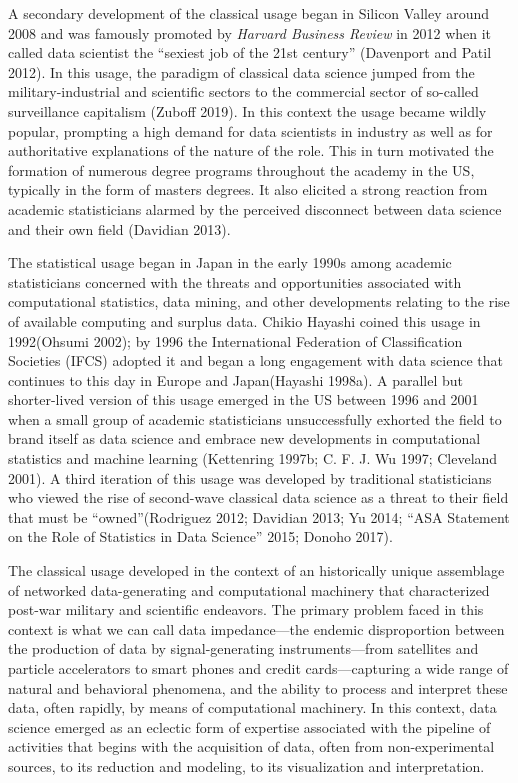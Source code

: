 \documentclass[
  letterpaper,
]{report}
\begin{document}
A secondary development of the classical usage began in Silicon Valley
around 2008 and was famously promoted by \emph{Harvard Business Review}
in 2012 when it called data scientist the ``sexiest job of the 21st
century'' (Davenport and Patil 2012). In this usage, the paradigm of
classical data science jumped from the military-industrial and
scientific sectors to the commercial sector of so-called surveillance
capitalism (Zuboff 2019). In this context the usage became wildly
popular, prompting a high demand for data scientists in industry as well
as for authoritative explanations of the nature of the role. This in
turn motivated the formation of numerous degree programs throughout the
academy in the US, typically in the form of masters degrees. It also
elicited a strong reaction from academic statisticians alarmed by the
perceived disconnect between data science and their own field (Davidian
2013).

The statistical usage began in Japan in the early 1990s among academic
statisticians concerned with the threats and opportunities associated
with computational statistics, data mining, and other developments
relating to the rise of available computing and surplus data. Chikio
Hayashi coined this usage in 1992(Ohsumi 2002); by 1996 the
International Federation of Classification Societies (IFCS) adopted it
and began a long engagement with data science that continues to this day
in Europe and Japan(Hayashi 1998a). A parallel but shorter-lived version
of this usage emerged in the US between 1996 and 2001 when a small group
of academic statisticians unsuccessfully exhorted the field to brand
itself as data science and embrace new developments in computational
statistics and machine learning (Kettenring 1997b; C. F. J. Wu 1997;
Cleveland 2001). A third iteration of this usage was developed by
traditional statisticians who viewed the rise of second-wave classical
data science as a threat to their field that must be ``owned''(Rodriguez
2012; Davidian 2013; Yu 2014; {``ASA Statement on the Role of Statistics
in Data Science''} 2015; Donoho 2017).

The classical usage developed in the context of an historically unique
assemblage of networked data-generating and computational machinery that
characterized post-war military and scientific endeavors. The primary
problem faced in this context is what we can call data impedance---the
endemic disproportion between the production of data by
signal-generating instruments---from satellites and particle
accelerators to smart phones and credit cards---capturing a wide range
of natural and behavioral phenomena, and the ability to process and
interpret these data, often rapidly, by means of computational
machinery. In this context, data science emerged as an eclectic form of
expertise associated with the pipeline of activities that begins with
the acquisition of data, often from non-experimental sources, to its
reduction and modeling, to its visualization and interpretation.
\end{document}
